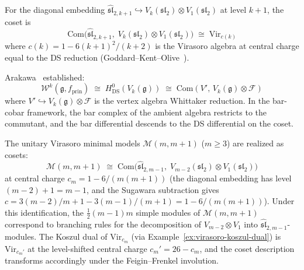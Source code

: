 \begin{theorem}
\label{thm:gko-coset}
For the diagonal embedding
$\widehat{\mathfrak{sl}}_{2,k+1} \hookrightarrow
V_k(\mathfrak{sl}_2) \otimes
V_1(\mathfrak{sl}_2)$ at level $k + 1$, the coset is
\begin{equation}\label{eq:gko-coset}
\mathrm{Com}\bigl(\widehat{\mathfrak{sl}}_{2,k+1},\;
V_k(\mathfrak{sl}_2) \otimes V_1(\mathfrak{sl}_2)\bigr)
\;\cong\; \mathrm{Vir}_{c(k)}
\end{equation}
where $c(k) = 1 - 6(k+1)^2/(k+2)$ is the Virasoro algebra at
central charge equal to the DS reduction
\textup{(}Goddard--Kent--Olive~\cite{GKO85}\textup{)}.
\end{theorem}

\begin{remark}\label{rem:ds-coset}
Arakawa~\cite{Arakawa17} established:
\begin{equation}\label{eq:ds-coset}
\mathcal{W}^k(\mathfrak{g}, f_{\mathrm{prin}})
\;\cong\; H^0_{\mathrm{DS}}(V_k(\mathfrak{g}))
\;\cong\; \mathrm{Com}(V',\, V_k(\mathfrak{g}) \otimes
\mathcal{F})
\end{equation}
where $V' \hookrightarrow V_k(\mathfrak{g}) \otimes \mathcal{F}$ is the vertex algebra Whittaker reduction.  In the bar-cobar framework, the bar complex of the ambient algebra restricts to the commutant, and the bar differential descends to the DS differential on the coset.
\end{remark}

\begin{example}
\label{ex:minimal-coset}
The unitary Virasoro minimal models $\mathcal{M}(m, m{+}1)$
($m \geq 3$) are realized as cosets:
\begin{equation}\label{eq:minimal-coset}
\mathcal{M}(m, m{+}1) \;\cong\;
\mathrm{Com}\bigl(\widehat{\mathfrak{sl}}_{2,m-1},\;
V_{m-2}(\mathfrak{sl}_2) \otimes V_1(\mathfrak{sl}_2)\bigr)
\end{equation}
at central charge $c_m = 1 - 6/(m(m{+}1))$
(the diagonal embedding has level $(m{-}2) + 1 = m{-}1$,
and the Sugawara subtraction gives
$c = 3(m{-}2)/m + 1 - 3(m{-}1)/(m{+}1) = 1 - 6/(m(m{+}1))$).
Under this identification, the $\tfrac{1}{2}(m{-}1)m$ simple
modules of $\mathcal{M}(m, m{+}1)$ correspond to branching
rules for the decomposition of $V_{m-2} \otimes V_1$ into
$\widehat{\mathfrak{sl}}_{2,m-1}$-modules.  The Koszul dual of
$\mathrm{Vir}_{c_m}$ (via
Example~\textup{\ref{ex:virasoro-koszul-dual}}) is
$\mathrm{Vir}_{c_m'}$ at the level-shifted central charge
$c_m' = 26 - c_m$, and the coset description transforms
accordingly under the Feigin--Frenkel involution.
\end{example}

